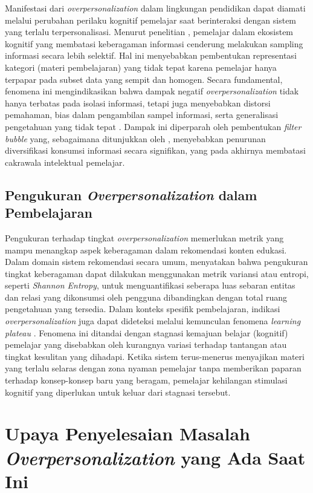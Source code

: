 Manifestasi dari \textit{overpersonalization} dalam lingkungan pendidikan dapat diamati melalui perubahan perilaku kognitif pemelajar saat berinteraksi dengan sistem yang terlalu terpersonalisasi. Menurut penelitian \textcite{Bahg2025}, pemelajar dalam ekosistem kognitif yang membatasi keberagaman informasi cenderung melakukan sampling informasi secara lebih selektif. Hal ini menyebabkan pembentukan representasi kategori (materi pembelajaran) yang tidak tepat karena pemelajar hanya terpapar pada subset data yang sempit dan homogen. Secara fundamental, fenomena ini mengindikasikan bahwa dampak negatif \textit{overpersonalization} tidak hanya terbatas pada isolasi informasi, tetapi juga menyebabkan distorsi pemahaman, bias dalam pengambilan sampel informasi, serta generalisasi pengetahuan yang tidak tepat \autocite{Bahg2025}. Dampak ini diperparah oleh pembentukan \textit{filter bubble} yang, sebagaimana ditunjukkan oleh \textcite{Jiang2025}, menyebabkan penurunan diversifikasi konsumsi informasi secara signifikan, yang pada akhirnya membatasi cakrawala intelektual pemelajar.

\subsection{Pengukuran \textit{Overpersonalization} dalam Pembelajaran}

Pengukuran terhadap tingkat \textit{overpersonalization} memerlukan metrik yang mampu menangkap aspek keberagaman dalam rekomendasi konten edukasi. Dalam domain sistem rekomendasi secara umum, \textcite{Ren2025} menyatakan bahwa pengukuran tingkat keberagaman dapat dilakukan menggunakan metrik variansi atau entropi, seperti \textit{Shannon Entropy}, untuk menguantifikasi seberapa luas sebaran entitas dan relasi yang dikonsumsi oleh pengguna dibandingkan dengan total ruang pengetahuan yang tersedia. Dalam konteks spesifik pembelajaran, indikasi \textit{overpersonalization} juga dapat dideteksi melalui kemunculan fenomena \textit{learning plateau} \autocite{Halkiopoulos2024}. Fenomena ini ditandai dengan stagnasi kemajuan belajar (kognitif) pemelajar yang disebabkan oleh kurangnya variasi terhadap tantangan atau tingkat kesulitan yang dihadapi. Ketika sistem terus-menerus menyajikan materi yang terlalu selaras dengan zona nyaman pemelajar tanpa memberikan paparan terhadap konsep-konsep baru yang beragam, pemelajar kehilangan stimulasi kognitif yang diperlukan untuk keluar dari stagnasi tersebut.

\section{Upaya Penyelesaian Masalah \textit{Overpersonalization} yang Ada Saat Ini}
\label{sec:upaya_penyelesaian}

